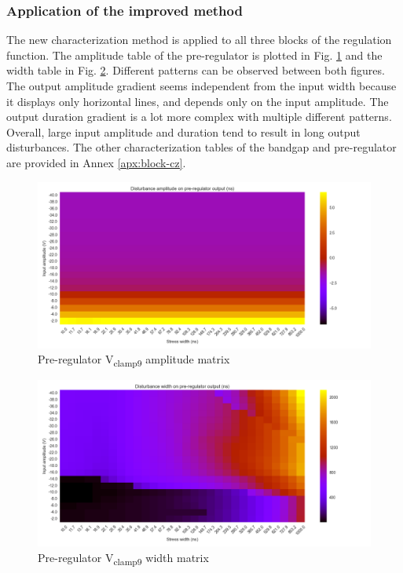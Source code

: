 \subsubsection{Application of the improved method}

The new characterization method is applied to all three blocks of the regulation function.
The amplitude table of the pre-regulator is plotted in Fig. \ref{fig:pre_regu_amp} and the width table in Fig. \ref{fig:pre_regu_width}.
Different patterns can be observed between both figures.
The output amplitude gradient seems independent from the input width because it displays only horizontal lines, and depends only on the input amplitude.
The output duration gradient is a lot more complex with multiple different patterns.
Overall, large input amplitude and duration tend to result in long output disturbances.
The other characterization tables of the bandgap and pre-regulator are provided in Annex \ref{apx:block-cz}.

\begin{figure}[!h]
  \centering
  \includegraphics[width=\textwidth]{src/4/figures/vpre_cz_v2_amplitude.png}
  \caption{Pre-regulator V\textsubscript{clamp9} amplitude matrix}
  \label{fig:pre_regu_amp}
\end{figure}

\begin{figure}[!h]
  \centering
  \includegraphics[width=\textwidth]{src/4/figures/vpre_cz_v2_width.png}
  \caption{Pre-regulator V\textsubscript{clamp9} width matrix}
  \label{fig:pre_regu_width}
\end{figure}


